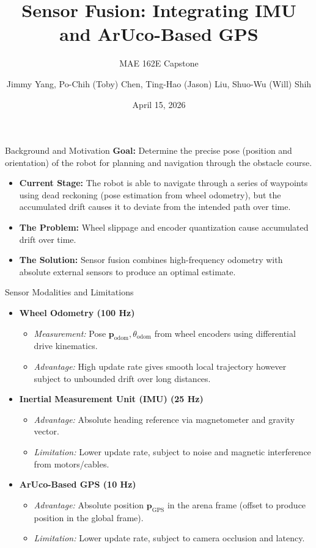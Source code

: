 \documentclass{beamer}
\title{Sensor Fusion: Integrating IMU and ArUco-Based GPS}
\subtitle{MAE 162E Capstone}
\author{Jimmy Yang, Po-Chih (Toby) Chen, Ting-Hao (Jason) Liu, Shuo-Wu (Will) Shih}
\date{April 15, 2026}
\begin{document}
\frame{\titlepage}

\begin{frame}{Background and Motivation}
    \textbf{Goal:} Determine the precise pose (position and orientation) of the robot for planning and navigation through the obstacle course.
    \vspace{0.5cm}
    \begin{itemize}
        \item \textbf{Current Stage:} The robot is able to navigate through a series of waypoints using dead reckoning (pose estimation from wheel odometry), but the accumulated drift causes it to deviate from the intended path over time.
        \item \textbf{The Problem:} Wheel slippage and encoder quantization cause accumulated drift over time.
        \item \textbf{The Solution:} Sensor fusion combines high-frequency odometry with absolute external sensors to produce an optimal estimate.
    \end{itemize}
\end{frame}


\begin{frame}{Sensor Modalities and Limitations}
    \begin{itemize}
        \item \textbf{Wheel Odometry (100 Hz)}
        \begin{itemize}
            \item \textit{Measurement:} Pose $\mathbf{p}_{\text{odom}}, \theta_{\text{odom}}$ from wheel encoders using differential drive kinematics.
            \item \textit{Advantage:} High update rate gives smooth local trajectory however subject to unbounded drift over long distances.
        \end{itemize}
        \item \textbf{Inertial Measurement Unit (IMU) (25 Hz)}
        \begin{itemize}
            \item \textit{Advantage:} Absolute heading reference via magnetometer and gravity vector.
            \item \textit{Limitation:} Lower update rate, subject to noise and magnetic interference from motors/cables.
        \end{itemize}
        \item \textbf{ArUco-Based GPS (10 Hz)}
        \begin{itemize}
            \item \textit{Advantage:} Absolute position $\mathbf{p}_{\text{GPS}}$  in the arena frame (offset to produce position in the global frame).
            \item \textit{Limitation:} Lower update rate, subject to camera occlusion and latency.
        \end{itemize}
    \end{itemize}
\end{frame}
\end{document}
